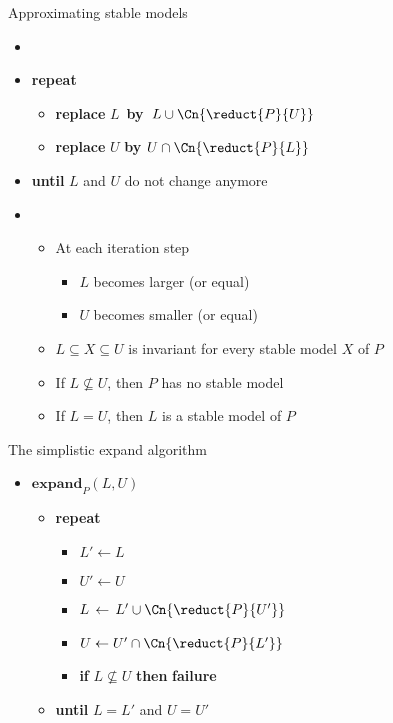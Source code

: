 \begin{frame}{Approximating stable models}
  \begin{itemize}
  \item {} \
    \smallskip
  \item []\textbf{repeat}
    \begin{itemize}\normalsize
    \item[] \textbf{replace} $L$\, \textbf{by}\, $L\cup\Cn{\reduct{P}{U}}$
    \item[] \textbf{replace} $U$   \textbf{by}   $U\cap\Cn{\reduct{P}{L}}$
    \end{itemize}
  \item [] \textbf{until} $L$ and $U$ do not change anymore
    \medskip
  \item<2->  \
    \begin{itemize}\normalsize
    \item At each iteration step
      \begin{itemize}\normalsize
      \item $L$ becomes larger  (or equal)
      \item $U$ becomes smaller (or equal)
      \end{itemize}
    \item $L\subseteq X\subseteq U$ is invariant for every stable model $X$ of $P$
      \medskip
    \item<3-> If $L\not\subseteq U$, then $P$ has no stable model
      \smallskip
    \item<4-> If $L=U$, then $L$ is a stable model of $P$
    \end{itemize}
  \end{itemize}
\end{frame}
\begin{frame}{The simplistic expand algorithm}
  \bigskip
  \begin{itemize}
  \item[] $\mathbf{expand}_{P}(L,U)$ \
    \begin{itemize}\normalsize
    \item[] \textbf{repeat} \
      \begin{itemize}\normalsize
      \item [] $L'\leftarrow L$
      \item [] $U'\leftarrow U$
        \smallskip
      \item [] $L\,\leftarrow\,L'\cup\Cn{\reduct{P}{U'}}$
      \item [] $U  \leftarrow  U'\cap\Cn{\reduct{P}{L'}}$
        \smallskip
      \item [] \textbf{if} $L\not\subseteq U$ \textbf{then} \textbf{failure}
        \smallskip
      \end{itemize}
    \item[]\textbf{until} $L=L'$ and $U=U'$
    \end{itemize}
  \end{itemize}
\end{frame}
